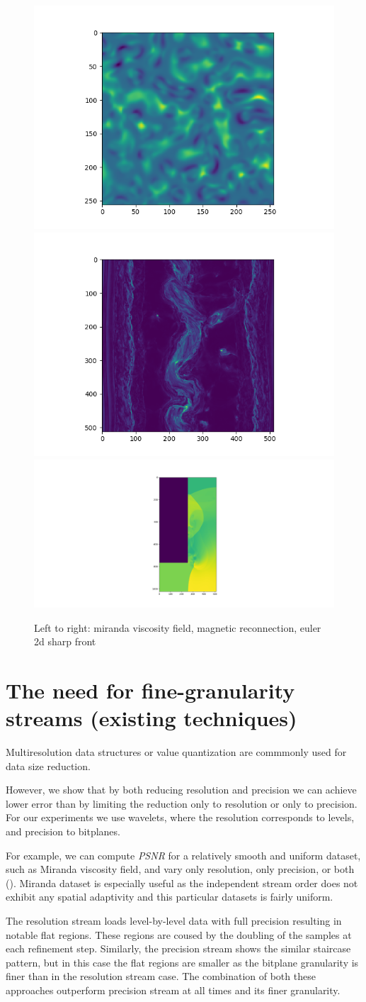 \begin{figure}[!htb]
        \includegraphics[width=0.33\linewidth]{img/dataset/miranda-viscosity.png}
        \includegraphics[width=0.33\linewidth]{img/dataset/magnetic.png}
        \includegraphics[width=0.33\linewidth]{img/dataset/euler2d.png}
        \caption{Left to right: miranda viscosity field, magnetic reconnection, euler 2d sharp front}
        \label{fig:datasets}
\end{figure}

\section{The need for fine-granularity streams (existing techniques)}
Multiresolution data structures or value quantization are commmonly used for data size
reduction.

However, we show that by both reducing resolution and precision we can achieve lower error
than by limiting the reduction only to resolution or only to precision. For our experiments
we use wavelets, where the resolution corresponds to levels, and precision to bitplanes.

For example, we can compute {\em PSNR} for a relatively smooth and uniform dataset, such as Miranda
viscosity field, and vary only resolution, only precision, or both (). Miranda
dataset is especially useful as the independent stream order does not exhibit any spatial adaptivity and
this particular datasets is fairly uniform.

The resolution stream loads level-by-level data with full precision resulting in notable flat regions. These
regions are coused by the doubling of the samples at each refinement step. Similarly, the precision stream
shows the similar staircase pattern, but in this case the flat regions are smaller as the bitplane granularity
is finer than in the resolution stream case. The combination of both these approaches outperform precision
stream at all times and its finer granularity.


